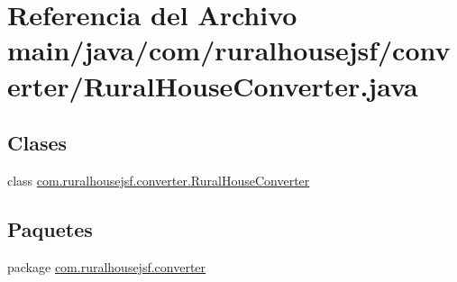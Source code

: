 \hypertarget{a00011}{}\section{Referencia del Archivo main/java/com/ruralhousejsf/converter/\+Rural\+House\+Converter.java}
\label{a00011}
\subsection*{Clases}
\begin{DoxyCompactItemize}
\item 
class \mbox{\hyperlink{a00140}{com.\+ruralhousejsf.\+converter.\+Rural\+House\+Converter}}
\end{DoxyCompactItemize}
\subsection*{Paquetes}
\begin{DoxyCompactItemize}
\item 
package \mbox{\hyperlink{a00111}{com.\+ruralhousejsf.\+converter}}
\end{DoxyCompactItemize}
